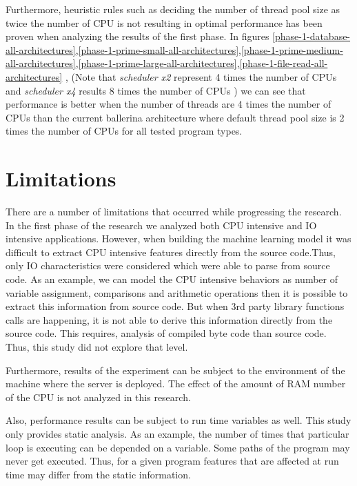 Furthermore, heuristic rules such as deciding the number of thread pool size as twice the number of CPU \cite{thread_pool_analysis} is not resulting in optimal performance has been proven when analyzing the results of the first phase. In figures \ref{phase-1-database-all-architectures},\ref{phase-1-prime-small-all-architectures},\ref{phase-1-prime-medium-all-architectures},\ref{phase-1-prime-large-all-architectures},\ref{phase-1-file-read-all-architectures} , (Note that \textit{scheduler x2} represent 4 times the number of CPUs and \textit{scheduler x4} results 8 times the number of CPUs ) we can see that performance is better when the number of threads are 4 times the number of CPUs than the current ballerina architecture where default thread pool size is 2 times the number of CPUs for all tested program types. 


\section{Limitations}

There are a number of limitations that occurred while progressing the research. In the first phase of the research we analyzed both CPU intensive and IO intensive applications. However, when building the machine learning model it was difficult to extract CPU intensive features directly from the source code.Thus, only IO characteristics were considered which were able to parse from source code. As an example, we can model the CPU intensive behaviors as number of variable assignment, comparisons and arithmetic operations then it is possible to extract this information from source code. But when 3rd party library functions calls are happening, it is not able to derive this information directly from the source code. This requires, analysis of compiled byte code than source code. Thus, this study did not explore that level.

Furthermore, results of the experiment can be subject to the environment of the machine where the server is deployed. The effect of the amount of RAM number of the CPU is not analyzed in this research.

Also, performance results can be subject to run time variables as well. This study only provides static analysis. As an example, the number of times that particular loop is executing can be depended on a variable. Some paths of the program may never get executed. Thus, for a given program features that are affected at run time may differ from the static information.



